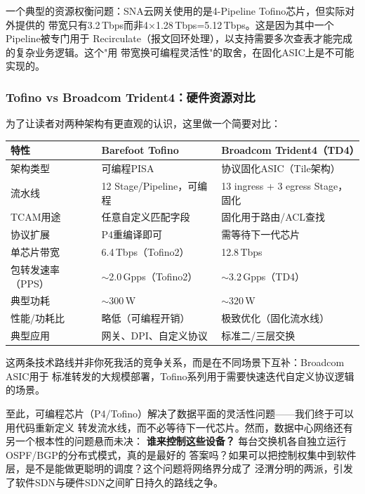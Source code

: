 一个典型的资源权衡问题：SNA云网关使用的是4-Pipeline Tofino芯片，但实际对外提供的
带宽只有3.2\,Tbps而非4×1.28\,Tbps=5.12\,Tbps。这是因为其中一个Pipeline被专门用于
Recirculate（报文回环处理），以支持需要多次查表才能完成的复杂业务逻辑。这个"用
带宽换可编程灵活性"的取舍，在固化ASIC上是不可能实现的。

\subsubsection{Tofino vs Broadcom Trident4：硬件资源对比}

为了让读者对两种架构有更直观的认识，这里做一个简要对比：

\begin{center}
\begin{tabular}{|l|l|l|}
\hline
\textbf{特性} & \textbf{Barefoot Tofino} & \textbf{Broadcom Trident4（TD4）} \\
\hline
架构类型 & 可编程PISA & 协议固化ASIC（Tile架构）\\
流水线 & 12 Stage/Pipeline，可编程 & 13 ingress + 3 egress Stage，固化 \\
TCAM用途 & 任意自定义匹配字段 & 固化用于路由/ACL查找 \\
协议扩展 & P4重编译即可 & 需等待下一代芯片 \\
单芯片带宽 & 6.4\,Tbps（Tofino2） & 12.8\,Tbps \\
包转发速率（PPS） & $\sim$2.0\,Gpps（Tofino2） & $\sim$3.2\,Gpps（TD4） \\
典型功耗 & $\sim$300\,W & $\sim$320\,W \\
性能/功耗比 & 略低（可编程开销） & 极致优化（固化流水线） \\
典型应用 & 网关、DPI、自定义协议 & 标准二/三层交换 \\
\hline
\end{tabular}
\end{center}

这两条技术路线并非你死我活的竞争关系，而是在不同场景下互补：Broadcom ASIC用于
标准转发的大规模部署，Tofino系列用于需要快速迭代自定义协议逻辑的场景。

至此，可编程芯片（P4/Tofino）解决了数据平面的灵活性问题——我们终于可以用代码重新定义
转发流水线，而不必等待下一代芯片。然而，数据中心网络还有另一个根本性的问题悬而未决：
\textbf{谁来控制这些设备？} 每台交换机各自独立运行OSPF/BGP的分布式模式，真的是最好的
答案吗？如果可以把控制权集中到软件层，是不是能做更聪明的调度？这个问题将网络界分成了
泾渭分明的两派，引发了软件SDN与硬件SDN之间旷日持久的路线之争。

